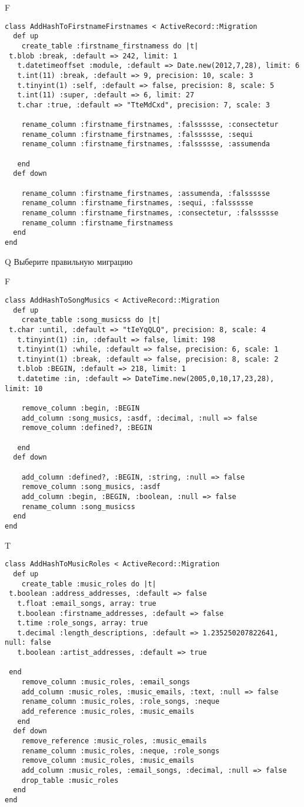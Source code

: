 F
\begin{verbatim}
class AddHashToFirstnameFirstnames < ActiveRecord::Migration
  def up
    create_table :firstname_firstnamess do |t| 
 t.blob :break, :default => 242, limit: 1
   t.datetimeoffset :module, :default => Date.new(2012,7,28), limit: 6
   t.int(11) :break, :default => 9, precision: 10, scale: 3
   t.tinyint(1) :self, :default => false, precision: 8, scale: 5
   t.int(11) :super, :default => 6, limit: 27
   t.char :true, :default => "TteMdCxd", precision: 7, scale: 3

    rename_column :firstname_firstnames, :falssssse, :consectetur
    rename_column :firstname_firstnames, :falssssse, :sequi
    rename_column :firstname_firstnames, :falssssse, :assumenda

   end
  def down

    rename_column :firstname_firstnames, :assumenda, :falssssse
    rename_column :firstname_firstnames, :sequi, :falssssse
    rename_column :firstname_firstnames, :consectetur, :falssssse
    rename_column :firstname_firstnamess
  end
end
\end{verbatim}
Q
Выберите правильную миграцию

F
\begin{verbatim}
class AddHashToSongMusics < ActiveRecord::Migration
  def up
    create_table :song_musicss do |t| 
 t.char :until, :default => "tIeYqQLQ", precision: 8, scale: 4
   t.tinyint(1) :in, :default => false, limit: 198
   t.tinyint(1) :while, :default => false, precision: 6, scale: 1
   t.tinyint(1) :break, :default => false, precision: 8, scale: 2
   t.blob :BEGIN, :default => 218, limit: 1
   t.datetime :in, :default => DateTime.new(2005,0,10,17,23,28), limit: 10

    remove_column :begin, :BEGIN
    add_column :song_musics, :asdf, :decimal, :null => false
    remove_column :defined?, :BEGIN

   end
  def down

    add_column :defined?, :BEGIN, :string, :null => false
    remove_column :song_musics, :asdf
    add_column :begin, :BEGIN, :boolean, :null => false
    rename_column :song_musicss
  end
end
\end{verbatim}

T
\begin{verbatim}
class AddHashToMusicRoles < ActiveRecord::Migration
  def up
    create_table :music_roles do |t|
 t.boolean :address_addresses, :default => false
   t.float :email_songs, array: true
   t.boolean :firstname_addresses, :default => false
   t.time :role_songs, array: true
   t.decimal :length_descriptions, :default => 1.235250207822641, null: false
   t.boolean :artist_addresses, :default => true

 end
    remove_column :music_roles, :email_songs
    add_column :music_roles, :music_emails, :text, :null => false
    rename_column :music_roles, :role_songs, :neque
    add_reference :music_roles, :music_emails
   end
  def down
    remove_reference :music_roles, :music_emails
    rename_column :music_roles, :neque, :role_songs
    remove_column :music_roles, :music_emails
    add_column :music_roles, :email_songs, :decimal, :null => false
    drop_table :music_roles
  end
end
\end{verbatim}


